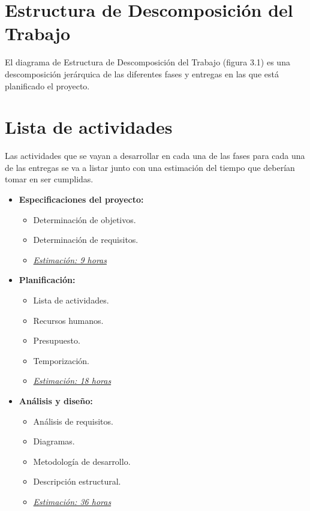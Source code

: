 \section{Estructura de Descomposición del Trabajo}

El diagrama de Estructura de Descomposición del Trabajo (figura 3.1) es una descomposición jerárquica de las diferentes fases y entregas en las que está planificado el proyecto.

\newpage
\section{Lista de actividades}

Las actividades que se vayan a desarrollar en cada una de las fases para cada una de las entregas se va a listar junto con una estimación del tiempo que deberían tomar en ser cumplidas.

\begin{itemize}
   \item \textbf{Especificaciones del proyecto:}
   \begin{itemize}
    \item Determinación de objetivos.
    \item Determinación de requisitos.
    \item \underline{\textit{Estimación: 9 horas}}
    \end{itemize}
\end{itemize}

\begin{itemize}
   \item \textbf{Planificación:}
   \begin{itemize}
    \item Lista de actividades.
    \item Recursos humanos.
    \item Presupuesto.
    \item Temporización.
    \item \underline{\textit{Estimación: 18 horas}}
   \end{itemize}
\end{itemize}

\begin{itemize}
   \item \textbf{Análisis y diseño:}
   \begin{itemize}
    \item Análisis de requisitos.
    \item Diagramas.
    \item Metodología de desarrollo.
    \item Descripción estructural.
    \item \underline{\textit{Estimación: 36 horas}}
   \end{itemize}
\end{itemize}

